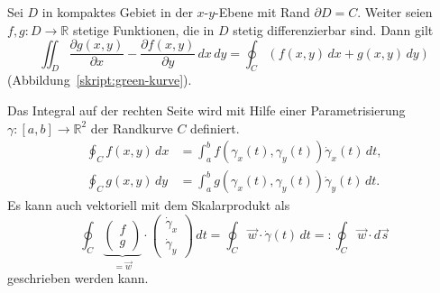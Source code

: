 \begin{satz}[Green]
\label{skript:2dim green}
Sei $D$ in kompaktes Gebiet in der $x$-$y$-Ebene mit Rand $\partial D=C$.
Weiter seien $f,g\colon D\to\mathbb R$ stetige Funktionen, die in $D$ 
stetig differenzierbar sind.
Dann gilt
\begin{equation}
\iint_{D}
\frac{\partial g(x,y)}{\partial x}
-
\frac{\partial f(x,y)}{\partial y}\,dx\,dy
=
\oint_C (f(x,y)\,dx + g(x,y)\,dy)
\label{skript:green formel}
\end{equation}
(Abbildung~\ref{skript:green-kurve}).
\end{satz}

Das Integral auf der rechten Seite wird mit Hilfe einer Parametrisierung
$\gamma\colon [a,b]\to\mathbb R^2$ der Randkurve $C$ definiert.
\begin{align*}
\oint_C f(x,y)\,dx
&=
\int_a^b f(\gamma_x(t),\gamma_y(t))\dot{\gamma}_x(t)\,dt,
\\
\oint_C g(x,y)\,dy
&=
\int_a^b g(\gamma_x(t),\gamma_y(t))\dot{\gamma}_y(t)\,dt.
\end{align*}
Es kann auch vektoriell mit dem Skalarprodukt als
\[
\oint_C
\underbrace{
\begin{pmatrix}f\\g\end{pmatrix}
}_{\displaystyle =\vec{w}}
\cdot
\begin{pmatrix}\dot\gamma_x\\\dot\gamma_y\end{pmatrix}
\,dt
=
\oint_C \vec{w}\cdot\dot\gamma(t)\,dt
=:
\oint_C \vec{w}\cdot d\vec{s}
\]
geschrieben werden kann.

